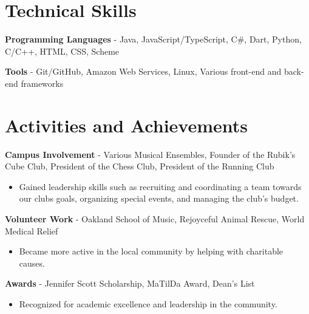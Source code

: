 \documentclass{article}
\newcommand{\resumesection}[1]{
	\section*{\Large\textbf{#1}}
	\hrulefill
	\vspace{1ex}
}
\begin{document}


\resumesection{Technical Skills}

\vspace{.2ex}

\textbf{Programming Languages} -  Java, JavaScript/TypeScript, C\#, Dart, Python, C/C++, HTML, CSS, Scheme


\textbf{Tools} - Git/GitHub, Amazon Web Services, Linux, Various front-end and back-end frameworks %

\vspace{.5ex}


\resumesection{Activities and Achievements}

\vspace{.2ex}

\textbf {Campus Involvement} - Various Musical Ensembles, Founder of the Rubik's Cube Club, President of the Chess Club, President of the Running Club


	\begin{itemize}
		\item Gained leadership skills such as recruiting and coordinating a team towards our clubs goals, organizing special events, and managing the club's budget.
	\end{itemize}

\textbf {Volunteer Work} - Oakland School of Music, Rejoyceful Animal Rescue, World Medical Relief

	\begin{itemize}
		\item Became more active in the local community by helping with charitable causes.
	\end{itemize}

\textbf {Awards} - Jennifer Scott Scholarship, MaTilDa Award, Dean's List

	\begin{itemize}
		\item Recognized for academic excellence and leadership in the community.
	\end{itemize}
\end{document}
